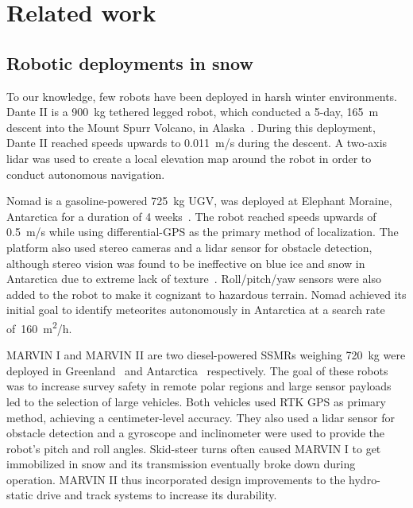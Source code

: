 \section{Related work}
\label{sec:rel_work}

\subsection{Robotic deployments in snow}
\label{sec:snow_robots}

To our knowledge, few robots have been deployed in harsh winter environments. 
Dante II is a \SI{900}{kg} tethered legged robot, which conducted a 5-day, \SI{165}{m} descent into the Mount Spurr Volcano, in Alaska~\citep{Bares1999}.
During this deployment, Dante II reached speeds upwards to \SI{0.011}{m/s} during the descent.
A two-axis lidar was used to create a local elevation map around the robot in order to conduct autonomous navigation.

Nomad is a gasoline-powered \SI{725}{kg} \ac{UGV}, was deployed at Elephant Moraine, Antarctica for a duration of 4 weeks~\citep{Apostolopoulos2000}. 
The robot reached speeds upwards of \SI{0.5}{m/s} while using differential-\ac{GPS} as the primary method of localization.
The platform also used stereo cameras and a lidar sensor for obstacle detection, although stereo vision was found to be ineffective  on blue ice and snow in Antarctica due to extreme lack of texture~\citep{Moorehead1999}.
Roll/pitch/yaw sensors were also added to the robot to make it cognizant to hazardous terrain.
Nomad achieved its initial goal to identify meteorites autonomously in Antarctica at a search rate of~\SI{160}{m^2/h}. %

MARVIN I and MARVIN II are two diesel-powered \acp{SSMR} weighing \SI{720}{kg} were deployed in Greenland~\citep{Stansbury2004} and Antarctica~\citep{Gifford2009} respectively. 
The goal of these robots was to increase survey safety in remote polar regions and large sensor payloads led to the selection of large vehicles.
Both vehicles used \ac{RTK} \ac{GPS} as primary method, achieving a centimeter-level accuracy.
They also used a lidar sensor for obstacle detection and a gyroscope and inclinometer were used to provide the robot's pitch and roll angles.
Skid-steer turns often caused MARVIN I to get immobilized in snow and its transmission eventually broke down during operation.
MARVIN II thus incorporated design improvements to the hydro-static drive and track systems to increase its durability.


